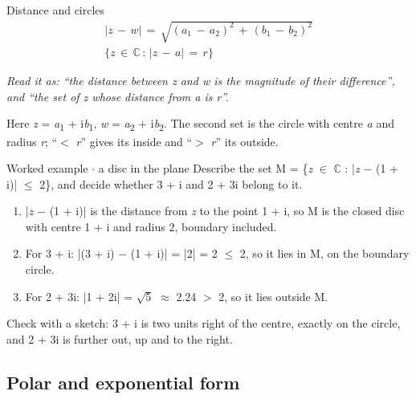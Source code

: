 \documentclass[11pt]{article}
\begin{document}
\begin{keepsection}
\begin{keepsection}
\begin{equationcard}{Distance and circles}
\[ \begin{gathered} |{z}\, -\, {w}|\, =\, \sqrt{({a}_{1}\, -\, {a}_{2})^{2}\, +\, ({b}_{1}\, -\, {b}_{2})^{2}} \\ \{{z}\, \in \, \mathbb{C}\, :\, |{z}\, -\, {a}|\, =\, {r}\} \end{gathered} \]
{\small \emph{Read it as: “the distance between z and w is the magnitude of their difference”, and “the set of z whose distance from a is r”.}\par Here \textit{z} = \textit{a}\textsubscript{1} + i\textit{b}\textsubscript{1}, \textit{w} = \textit{a}\textsubscript{2} + i\textit{b}\textsubscript{2}. The second set is the circle with centre \textit{a} and radius \textit{r}; “\ensuremath{<} \textit{r}” gives its inside and “\ensuremath{>} \textit{r}” its outside.}
\end{equationcard}

\begin{workedbox}{Worked example \ensuremath{\cdot} a disc in the plane}
Describe the set M = \{\textit{z} \ensuremath{\in} \ensuremath{\mathbb{C}} : |\textit{z} \ensuremath{-} (1 + i)| \ensuremath{\leq} 2\}, and decide whether 3 + i and 2 + 3i belong to it.

\begin{enumerate}
\item |\textit{z} \ensuremath{-} (1 + i)| is the distance from \textit{z} to the point 1 + i, so M is the closed disc with centre 1 + i and radius 2, boundary included.
\item For 3 + i: |(3 + i) \ensuremath{-} (1 + i)| = |2| = 2 \ensuremath{\leq} 2, so it lies in M, on the boundary circle.
\item For 2 + 3i: |1 + 2i| = \ensuremath{\sqrt{5}} \ensuremath{\approx} 2.24 \ensuremath{>} 2, so it lies outside M.
\end{enumerate}

Check with a sketch: 3 + i is two units right of the centre, exactly on the circle, and 2 + 3i is further out, up and to the right.
\end{workedbox}
\end{keepsection}

\begin{keepsection}
\subsection{Polar and exponential form}


\end{keepsection}
\end{keepsection}
\end{document}
